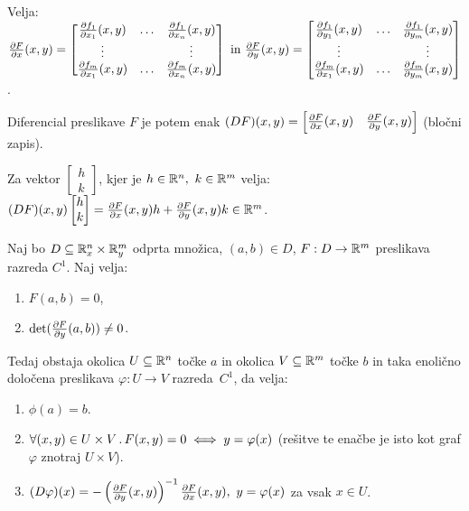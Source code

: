 Velja: 
$\frac{\partial F}{\partial x}(x,y) = \begin{bmatrix}
    \frac{\partial f_1}{\partial x_1}(x,y) & \ldots & \frac{\partial f_1}{\partial x_n}(x,y) \\
    \vdots & & \vdots \\
    \frac{\partial f_m}{\partial x_1}(x,y) & \ldots & \frac{\partial f_m}{\partial x_n}(x,y) 
\end{bmatrix} \text{ in } \frac{\partial F}{\partial y}(x,y) = \begin{bmatrix}
    \frac{\partial f_1}{\partial y_1}(x,y) & \ldots & \frac{\partial f_1}{\partial y_m}(x,y) \\
    \vdots & & \vdots \\
    \frac{\partial f_m}{\partial x_1}(x,y) & \ldots & \frac{\partial f_m}{\partial y_m}(x,y) 
\end{bmatrix}$.

Diferencial preslikave $F$ je potem enak $(DF)(x,y) = \begin{bmatrix}
    \frac{\partial F}{\partial x}(x,y) & \frac{\partial F}{\partial y}(x,y)
\end{bmatrix}$ (bločni zapis).

\begin{opomba}
    Za vektor $\begin{bmatrix}
        h \\ k
    \end{bmatrix}$, kjer je $h \in \mathbb{R}^n, \ k \in \mathbb{R}^m$ velja: $(DF)(x,y)  \begin{bmatrix}
        h \\ k
    \end{bmatrix} = \frac{\partial F}{\partial x}(x,y)  h + \frac{\partial F}{\partial y}(x,y)  k \in \mathbb{R}^m$.
\end{opomba}

\begin{izrek}
    Naj bo $D\subseteq \mathbb{R}_x^n \times \mathbb{R}_y^m$ odprta množica, $(a, b) \in D$, $F: D \to \mathbb{R}^m$ preslikava razreda $C^1$. Naj velja:
    \begin{enumerate}
        \item $F(a, b) = 0$,
        \item $\det(\frac{\partial F}{\partial y}(a,b)) \neq 0$.
    \end{enumerate}
    Tedaj obstaja okolica $U \subseteq \mathbb{R}^n$ točke $a$ in okolica $V \subseteq \mathbb{R}^m$ točke $b$ in taka enolično določena preslikava $\varphi: U \to V$ razreda~$C^1$, da velja:
    \begin{enumerate}
        \item $\phi(a) = b$.
        \item $\forall (x,y) \in U \times V \,.\, F(x,y) = 0 \iff y = \varphi(x)$ (rešitve te enačbe je isto kot graf $\varphi$ znotraj $U \times V$).
        \item $(D \varphi)(x) = - \left(\frac{\partial F}{\partial y}(x,y)\right)^{-1} \frac{\partial F}{\partial x}(x,y), \ y = \varphi(x)$ za vsak $x \in U$.
    \end{enumerate}
\end{izrek}

